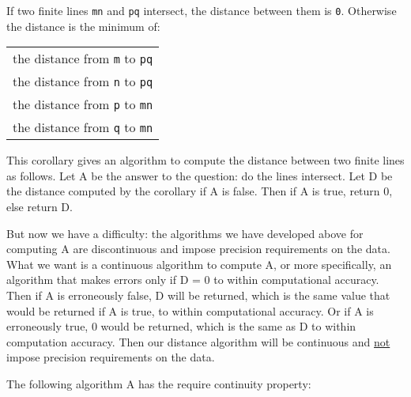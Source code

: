 \documentclass[12pt]{article}
\begin{document}
\begin{corollary}
If two finite lines {\tt mn} and {\tt pq} intersect, the distance
between them is {\tt 0}.  Otherwise the distance is the minimum of: \\
\hspace*{0.5in}\begin{tabular}{l}
the distance from {\tt m} to {\tt pq} \\
the distance from {\tt n} to {\tt pq} \\
the distance from {\tt p} to {\tt mn} \\
the distance from {\tt q} to {\tt mn} \\
\end{tabular}
\end{corollary}

This corollary gives an algorithm to compute the distance between
two finite lines as follows.  Let A be the answer to the question:
do the lines intersect.  Let D be the distance computed by the
corollary if A is false.  Then if A is true, return 0, else return D.

But now we have a difficulty: the algorithms we have developed
above for computing A are discontinuous and impose precision
requirements on the data.  What we want is a continuous algorithm 
to compute A,
or more specifically, an algorithm that makes errors only if D = 0
to within computational accuracy.  Then if A is erroneously
false, D will be returned, which is the same value that would be
returned if A is true, to within computational accuracy.  Or if
A is erroneously true, 0 would be returned, which is the same as
D to within computation accuracy.  Then
our distance algorithm will be continuous and \underline{not} impose
precision requirements on the data.

The following algorithm A has the require continuity property:
\end{document}
